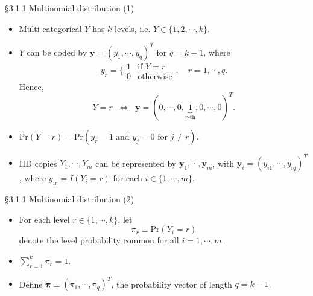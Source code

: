 \documentclass{beamer}
\newenvironment{wideitemize}%
  {\begin{itemize}%
    \setlength{\parskip}{1em}}%
  {\end{itemize}}
\begin{document}
\begin{frame}{\S3.1.1 Multinomial distribution (1)}
\begin{wideitemize}
\item
Multi-categorical $Y$ has $k$ levels, i.e. $Y\in\{1,2,\cdots, k\}$. 
\item
$Y$ can be coded by $\displaystyle \textbf{y}=(y_1,\cdots, y_q)^T$ for $q=k-1$, where
\[
 y_r=\Bigg\{\begin{array}{cl} 1 & \mbox{if $Y=r$} \\ 0 & \mbox{otherwise}\end{array},  \quad r=1,\cdots,q.
\]
Hence, 
\[
Y=r \;\; \Longleftrightarrow \;\; \textbf{y}=(0,\cdots,0,\underbrace{1}_{r\text{-th}}, 0,\cdots,0)^T.
\]

\item  $\mbox{Pr}(Y=r)=\mbox{Pr}(y_r=1 \;\mbox{and $y_j=0$ for $j\neq r$})$.
\item
IID copies $Y_1,\cdots,Y_m$  can be represented
by $\textbf{y}_1, \cdots, \textbf{y}_m$, with $\textbf{y}_i=(y_{i1},\cdots, y_{iq})^T$, where $y_{ir}=I(Y_i=r)$ for  each $i \in \{1,\cdots,m\}$.
\end{wideitemize}
\end{frame}

\begin{frame}{\S3.1.1 Multinomial distribution (2)}
\begin{wideitemize}
\item For each level $r \in \{1,\cdots,k\}$, let 
\[
\pi_r\equiv\mbox{Pr}(Y_i=r)
\]
 denote the level probability common for all $i=1,\cdots,m$. 
\item  $\sum_{r=1}^k\pi_r=1$.
\item
Define ${\boldsymbol \pi}\equiv(\pi_1,\cdots, \pi_q)^T$, the probability vector of length $q=k-1$.




\end{wideitemize}
\end{frame}
\end{document}
